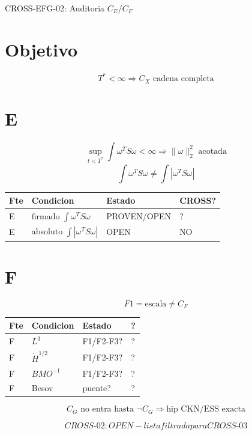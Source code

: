 \documentclass[10pt]{article}
\begin{document}
\begin{center}
{\Large CROSS-EFG-02: Auditoria $C_E/C_F$}
\end{center}

\section*{Objetivo}
\[
\boxed{T^*<\infty\Rightarrow C_X\text{ cadena completa}}
\]

\section*{E}
\[
\sup_{t<T^*}\int\omega^T S\omega<\infty\Rightarrow\|\omega\|_2^2\text{ acotada}
\]
\[
\boxed{\int\omega^T S\omega\neq\int|\omega^T S\omega|}
\]

{\small
\begin{tabular}{|p{0.6cm}|p{3.2cm}|p{2.5cm}|p{1.5cm}|}
\hline
Fte & Condicion & Estado & CROSS?\\ \hline
E & firmado $\int\omega^T S\omega$ & PROVEN/OPEN &?\\ \hline
E & absoluto $\int|\omega^T S\omega|$ & OPEN & NO\\ \hline
\end{tabular}
}

\section*{F}
\[
\boxed{F1=\text{escala}\neq C_F}
\]

{\small
\begin{tabular}{|p{0.6cm}|p{2.0cm}|p{2.5cm}|p{1.2cm}|}
\hline
Fte & Condicion & Estado &?\\ \hline
F & $L^3$ & F1/F2-F3? &?\\ \hline
F & $\dot H^{1/2}$ & F1/F2-F3? &?\\ \hline
F & $BMO^{-1}$ & F1/F2-F3? &?\\ \hline
F & Besov & puente? &?\\ \hline
\end{tabular}
}

\[
\boxed{C_G\text{ no entra hasta }\neg C_G\Rightarrow\text{hip CKN/ESS exacta}}
\]

\[
\boxed{CROSS\text{-}02: OPEN - lista filtrada para CROSS\text{-}03}
\]
\end{document}
